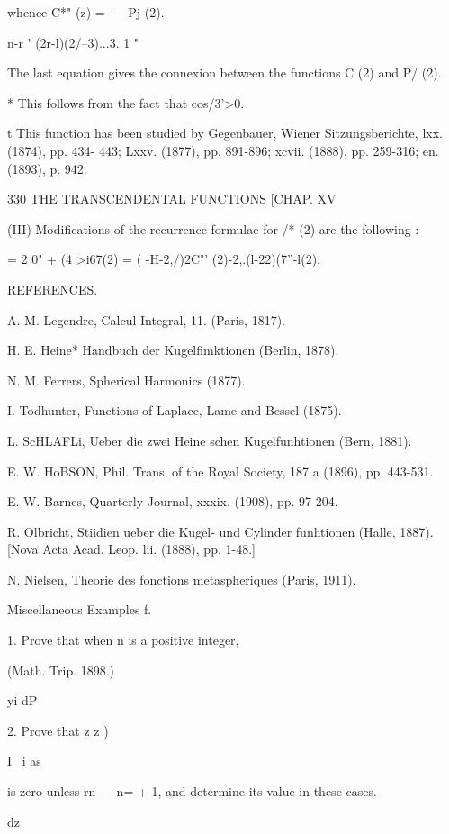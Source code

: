 {{{{whence C*"  (z) = -  ~  Pj (2). 

n-r  ' (2r-l)(2/--3)...3. 1 "   

The last equation gives the connexion between the functions C  (2) and P/ (2). 

* This follows from the fact that cos/3'>0. 

t This function has been studied by Gegenbauer, Wiener Sitzungsberichte, lxx. (1874), pp. 434- 
443; Lxxv. (1877), pp. 891-896; xcvii. (1888), pp. 259-316; en. (1893), p. 942. 



330 THE TRANSCENDENTAL FUNCTIONS [CHAP. XV 

(III) Modifications of the recurrence-formulae for /*  (2) are the following : 

   = 2 0" +   (4 >i67(2) = ( -H-2,/)2C"' (2)-2,.(l-22)(7''-l(2). 



REFERENCES. 

A. M. Legendre, Calcul Integral, 11. (Paris, 1817). 

H. E. Heine* Handbuch der Kugelfimktionen (Berlin, 1878). 

N. M. Ferrers, Spherical Harmonics (1877). 

I. Todhunter, Functions of Laplace, Lame and Bessel (1875). 

L. ScHLAFLi, Ueber die zwei Heine schen Kugelfunhtionen (Bern, 1881). 

E. W. HoBSON, Phil. Trans, of the Royal Society, 187 a (1896), pp. 443-531. 

E. W. Barnes, Quarterly Journal, xxxix. (1908), pp. 97-204. 

R. Olbricht, Stiidien ueber die Kugel- und Cylinder funhtionen (Halle, 1887). [Nova 
Acta Acad. Leop. lii. (1888), pp. 1-48.] 

N. Nielsen, Theorie des fonctions metaspheriques (Paris, 1911). 

Miscellaneous Examples f. 

1. Prove that when n is a positive integer, 

(Math. Trip. 1898.) 



yi dP 

2. Prove that z  z )  

I \ i as 

is zero unless rn — n= + 1, and determine its value in these cases. 



dz 



}}}}
